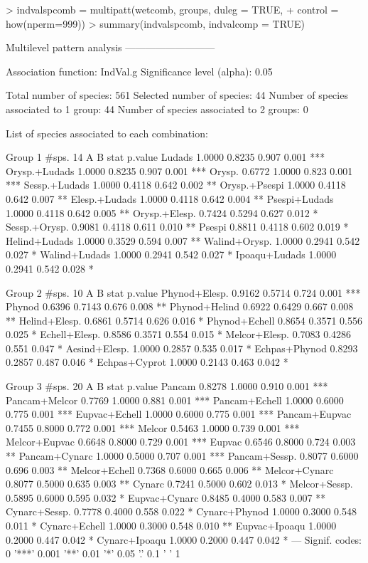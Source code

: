 \documentclass[11pt,a4paper]{article}
\begin{document}
\begin{Schunk}
\begin{Sinput}
> indvalspcomb = multipatt(wetcomb, groups, duleg = TRUE, 
+                        control = how(nperm=999))
> summary(indvalspcomb, indvalcomp = TRUE)
\end{Sinput}
\begin{Soutput}
 Multilevel pattern analysis
 ---------------------------

 Association function: IndVal.g
 Significance level (alpha): 0.05

 Total number of species: 561
 Selected number of species: 44 
 Number of species associated to 1 group: 44 
 Number of species associated to 2 groups: 0 

 List of species associated to each combination: 

 Group 1  #sps.  14 
                   A      B  stat p.value    
Ludads        1.0000 0.8235 0.907   0.001 ***
Orysp.+Ludads 1.0000 0.8235 0.907   0.001 ***
Orysp.        0.6772 1.0000 0.823   0.001 ***
Sessp.+Ludads 1.0000 0.4118 0.642   0.002 ** 
Orysp.+Psespi 1.0000 0.4118 0.642   0.007 ** 
Elesp.+Ludads 1.0000 0.4118 0.642   0.004 ** 
Psespi+Ludads 1.0000 0.4118 0.642   0.005 ** 
Orysp.+Elesp. 0.7424 0.5294 0.627   0.012 *  
Sessp.+Orysp. 0.9081 0.4118 0.611   0.010 ** 
Psespi        0.8811 0.4118 0.602   0.019 *  
Helind+Ludads 1.0000 0.3529 0.594   0.007 ** 
Walind+Orysp. 1.0000 0.2941 0.542   0.027 *  
Walind+Ludads 1.0000 0.2941 0.542   0.027 *  
Ipoaqu+Ludads 1.0000 0.2941 0.542   0.028 *  

 Group 2  #sps.  10 
                   A      B  stat p.value    
Phynod+Elesp. 0.9162 0.5714 0.724   0.001 ***
Phynod        0.6396 0.7143 0.676   0.008 ** 
Phynod+Helind 0.6922 0.6429 0.667   0.008 ** 
Helind+Elesp. 0.6861 0.5714 0.626   0.016 *  
Phynod+Echell 0.8654 0.3571 0.556   0.025 *  
Echell+Elesp. 0.8586 0.3571 0.554   0.015 *  
Melcor+Elesp. 0.7083 0.4286 0.551   0.047 *  
Aesind+Elesp. 1.0000 0.2857 0.535   0.017 *  
Echpas+Phynod 0.8293 0.2857 0.487   0.046 *  
Echpas+Cyprot 1.0000 0.2143 0.463   0.042 *  

 Group 3  #sps.  20 
                   A      B  stat p.value    
Pancam        0.8278 1.0000 0.910   0.001 ***
Pancam+Melcor 0.7769 1.0000 0.881   0.001 ***
Pancam+Echell 1.0000 0.6000 0.775   0.001 ***
Eupvac+Echell 1.0000 0.6000 0.775   0.001 ***
Pancam+Eupvac 0.7455 0.8000 0.772   0.001 ***
Melcor        0.5463 1.0000 0.739   0.001 ***
Melcor+Eupvac 0.6648 0.8000 0.729   0.001 ***
Eupvac        0.6546 0.8000 0.724   0.003 ** 
Pancam+Cynarc 1.0000 0.5000 0.707   0.001 ***
Pancam+Sessp. 0.8077 0.6000 0.696   0.003 ** 
Melcor+Echell 0.7368 0.6000 0.665   0.006 ** 
Melcor+Cynarc 0.8077 0.5000 0.635   0.003 ** 
Cynarc        0.7241 0.5000 0.602   0.013 *  
Melcor+Sessp. 0.5895 0.6000 0.595   0.032 *  
Eupvac+Cynarc 0.8485 0.4000 0.583   0.007 ** 
Cynarc+Sessp. 0.7778 0.4000 0.558   0.022 *  
Cynarc+Phynod 1.0000 0.3000 0.548   0.011 *  
Cynarc+Echell 1.0000 0.3000 0.548   0.010 ** 
Eupvac+Ipoaqu 1.0000 0.2000 0.447   0.042 *  
Cynarc+Ipoaqu 1.0000 0.2000 0.447   0.042 *  
---
Signif. codes:  0 '***' 0.001 '**' 0.01 '*' 0.05 '.' 0.1 ' ' 1 
\end{Soutput}
\end{Schunk}
\end{document}
